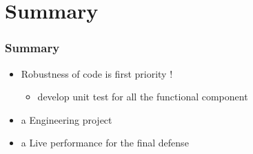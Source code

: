 \documentclass[t]{beamer}
\begin{document}
\section{Summary}
\begin{frame}
\frametitle{Summary}
\begin{itemize}
  \item Robustness of code is first priority ! 
    \begin{itemize}
      \item develop unit test for all the functional component  
    \end{itemize}
  \item a Engineering project 
  \item a Live performance for the final defense 
\end{itemize}
\end{frame}
\end{document}
